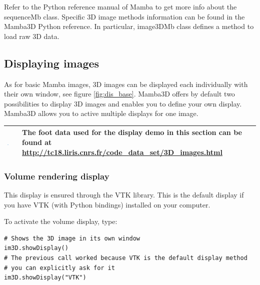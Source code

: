 \documentclass[a4paper,10pt,oneside]{article}
\newenvironment{tipBox}
{
    \begin{center}
    \begin{tabular}{ | b{0.1\textwidth} b{0.8\textwidth} | }
    \hline
    \rowcolor{lightblue}
    \includegraphics[width=0.1\textwidth]{Crystal_Clear_action_info.png} &
}
{
    \\
    \hline
    \end{tabular}
    \end{center}
}
\begin{document}
Refer to the Python reference manual of Mamba to get more info about the 
sequenceMb class. Specific 3D image methods information can be found in the
Mamba3D Python reference. In particular, image3DMb class defines a method
to load raw 3D data.

\subsection{Displaying images}
\label{cha:disp_im}

As for basic Mamba images, 3D images can be displayed each individually with
their own window, see figure \ref{fig:dis_base}. Mamba3D offers by default
two possibilities to display 3D images and enables you to define your own
display. Mamba3D allows you to active multiple displays for one image.

\begin{tipBox}
The foot data used for the display demo in this section can be found at
\url{http://tc18.liris.cnrs.fr/code_data_set/3D_images.html}
\end{tipBox}

\subsubsection{Volume rendering display}
This display is ensured through the VTK library. This is the default display
if you have VTK (with Python bindings) installed on your computer.

To activate the volume display, type:

\lstset{language=Python}
\begin{lstlisting}
# Shows the 3D image in its own window
im3D.showDisplay()
# The previous call worked because VTK is the default display method
# you can explicitly ask for it
im3D.showDisplay("VTK")
\end{lstlisting}
\end{document}
